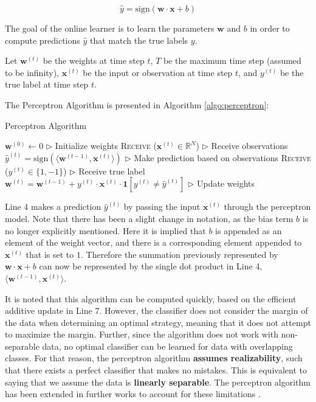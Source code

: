 \documentclass[11pt]{article}
\begin{document}
$$\hat{y} = \text{sign}(\boldsymbol{w}\cdot\boldsymbol{x}+b)$$

The goal of the online learner is to learn the parameters $\boldsymbol{w}$ and $b$ in order to compute predictions $\hat{y}$ that match the true labels $y$.

Let $\boldsymbol{w}^{(t)}$ be the weights at time step $t$, $T$ be the maximum time step (assumed to be infinity), $\boldsymbol{x}^{(t)}$ be the input or observation at time step $t$, and $y^{(t)}$ be the true label at time step $t$.

The Perceptron Algorithm is presented in Algorithm \ref{algo:perceptron}:

\begin{algorithm}[H]
\caption{Perceptron Algorithm}
\label{algo:perceptron}
\begin{algorithmic}[1]
\STATE $\boldsymbol{w}^{(0)} \xleftarrow{} 0 $  \hfill $\triangleright$ Initialize weights
\STATE \textsc{Receive} ($\boldsymbol{x}^{(t)} \in \mathbb{R}^N$) \hfill $\triangleright$ Receive observations
\STATE $\hat{y}^{(t)} = \text{sign} \left( \langle \boldsymbol{w}^{(t-1)}, \boldsymbol{x}^{(t)} \rangle \right)$ \hfill $\triangleright$ Make prediction based on observations
\STATE \textsc{Receive} ($y^{(t)}\in \{1,-1\}$) \hfill $\triangleright$ Receive true label
\STATE $\boldsymbol{w}^{(t)} = \boldsymbol{w}^{(t-1)} + y^{(t)} \cdot \boldsymbol{x}^{(t)} \cdot \boldsymbol{1}[y^{(t)}\neq\hat{y}^{(t)}] $ \hfill $\triangleright$ Update weights
\ENDFOR
\end{algorithmic}
\end{algorithm}

Line 4 makes a prediction $\hat{y}^{(t)}$ by passing the input $\boldsymbol{x}^{(t)}$ through the perceptron model. Note that there has been a slight change in notation, as the bias term $b$ is no longer explicitly mentioned. Here it is implied that $b$ is appended as an element of the weight vector, and there is a corresponding element appended to $\boldsymbol{x}^{(t)}$ that is set to $1$. Therefore the summation previously represented by $\boldsymbol{w}\cdot\boldsymbol{x}+b$ can now be represented by the single dot product in Line 4, $\langle \boldsymbol{w}^{(t-1)}, \boldsymbol{x}^{(t)} \rangle$.

It is noted that this algorithm can be computed quickly, based on the efficient additive update in Line 7. However, the classifier does not consider the margin of the data when determining an optimal strategy, meaning that it does not attempt to maximize the margin. Further, since the algorithm does not work with non-separable data, no optimal classifier can be learned for data with overlapping classes. For that reason, the perceptron algorithm \textbf{assumes realizability}, such that there exists a perfect classifier that makes no mistakes. This is equivalent to saying that we assume the data is \textbf{linearly separable}. The perceptron algorithm has been extended in further works to account for these limitations \cite{shalev-shwartz--singer}. 
\end{document}
